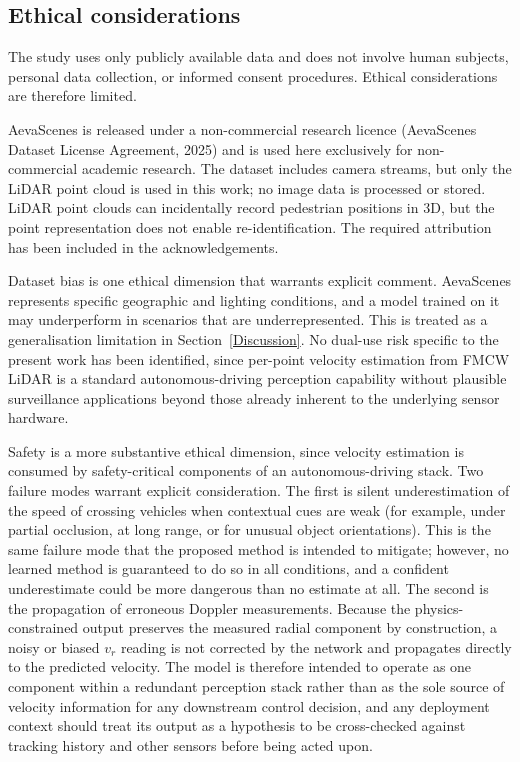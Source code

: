 \documentclass[a4paper,12pt]{article}
\begin{document}
\subsection{Ethical considerations}

The study uses only publicly available data and does not involve human subjects, personal data collection, or informed consent procedures. Ethical considerations are therefore limited.

AevaScenes is released under a non-commercial research licence (AevaScenes Dataset License Agreement, 2025) and is used here exclusively for non-commercial academic research. The dataset includes camera streams, but only the LiDAR point cloud is used in this work; no image data is processed or stored. LiDAR point clouds can incidentally record pedestrian positions in 3D, but the point representation does not enable re-identification. The required attribution has been included in the acknowledgements.

Dataset bias is one ethical dimension that warrants explicit comment. AevaScenes represents specific geographic and lighting conditions, and a model trained on it may underperform in scenarios that are underrepresented. This is treated as a generalisation limitation in Section~\ref{Discussion}. No dual-use risk specific to the present work has been identified, since per-point velocity estimation from FMCW LiDAR is a standard autonomous-driving perception capability without plausible surveillance applications beyond those already inherent to the underlying sensor hardware.

Safety is a more substantive ethical dimension, since velocity estimation is consumed by safety-critical components of an autonomous-driving stack. Two failure modes warrant explicit consideration. The first is silent underestimation of the speed of crossing vehicles when contextual cues are weak (for example, under partial occlusion, at long range, or for unusual object orientations). This is the same failure mode that the proposed method is intended to mitigate; however, no learned method is guaranteed to do so in all conditions, and a confident underestimate could be more dangerous than no estimate at all. The second is the propagation of erroneous Doppler measurements. Because the physics-constrained output preserves the measured radial component by construction, a noisy or biased $v_r$ reading is not corrected by the network and propagates directly to the predicted velocity. The model is therefore intended to operate as one component within a redundant perception stack rather than as the sole source of velocity information for any downstream control decision, and any deployment context should treat its output as a hypothesis to be cross-checked against tracking history and other sensors before being acted upon.
\end{document}
